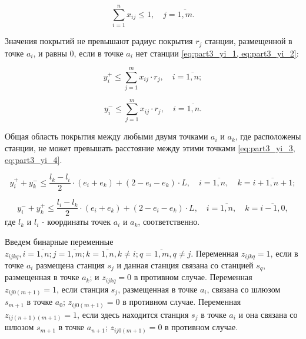 \begin{equation}
  \label{eq:part3_xij}
  \sum\limits_{i=1}^n x_{ij} \leq 1, \quad j = \overline{1,m}. 
\end{equation}

Значения покрытий не превышают радиус покрытия $r_j$ станции, размещенной в точке $ a_i $, и равны 0, если в точке $a_i$  нет станции \cref{eq:part3_yi_1, eq:part3_yi_2}:

\begin{equation}
  \label{eq:part3_yi_1}
  y_i^+ \leq \sum\limits_{j=1}^m x_{ij} \cdot r_j, \quad i = \overline{1,n};
\end{equation}

\begin{equation}
  \label{eq:part3_yi_2}
  y_i^- \leq \sum\limits_{j=1}^m x_{ij} \cdot r_j, \quad i = \overline{1,n}. 
\end{equation}

Общая область покрытия между любыми двумя точками $ a_i $ и $ a_k $, где расположены станции, не может превышать расстояние между этими точками \cref{eq:part3_yi_3, eq:part3_yi_4}.

\begin{equation}
  \label{eq:part3_yi_3}
  y_i^+ + y_k^- \leq \frac{l_k - l_i}{2} \cdot (e_i + e_k ) + (2 - e_i - e_k ) \cdot L, \quad i = \overline{1,n},  \quad k = \overline{i+1,n+1};
\end{equation}

\begin{equation}
  \label{eq:part3_yi_4}
  y_i^- + y_k^+  \leq \frac{l_i-l_k}{2} \cdot (e_i + e_k) + (2 - e_i - e_k) \cdot L, \quad i = \overline{1,n}, \quad k = \overline{i-1,0},
\end{equation}
где $ l_k $ и $ l_i $ - координаты точек $ a_i $ и $ a_k $, соответственно. 


Введем бинарные переменные $z_{ijkq}, i = \overline{1,n}; j= \overline{1,m}; k=\overline{1,n},  k \neq i; q= \overline{1,m}, q \neq j$. Переменная $ z_ {ijkq} = 1$, если в точке $ a_i $ размещена станция $ s_j $ и данная станция связана со станцией $ s_q $, размещенная в точке $ a_k $; и $ z_ {ijkq} = 0 $ в противном случае.
Переменная $ z_{ij0(m + 1)} = 1$, если станция $ s_j $, размещенная в точке $ a_i $, связана со шлюзом $ s_{m + 1} $ в точке $ a_0 $; $ z_{ij0 (m + 1)} = 0 $ в противном случае. Переменная $ z_{ij(n + 1)(m + 1)} = 1 $, если здесь находится станция $ s_j $ в точке $ a_i $ и она связана со шлюзом $ s_{m + 1} $ в точке $ a_{n + 1} $; $ z_{ij0(m + 1)} = 0 $  в противном случае.

